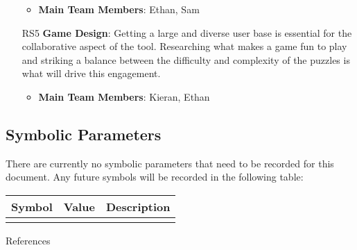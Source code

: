 \documentclass[12pt]{article}
\begin{document}
\begin{itemize}
    \begin{itemize}
        \item \textbf{Main Team Members}: Ethan, Sam
    \end{itemize}
    \item [RS5]\textbf{Game Design}: Getting a large and diverse user base is essential for the collaborative aspect of the tool. Researching what makes a game fun to play and striking a balance between the difficulty and complexity of the puzzles is what will drive this engagement. 
    \begin{itemize}
        \item \textbf{Main Team Members}: Kieran, Ethan
    \end{itemize}
\end{itemize}

\subsection{Symbolic Parameters}

There are currently no symbolic parameters that need to be recorded for this document. Any future symbols will be recorded in the following table: 

\begin{table}[h]
\begin{tabular}{|c|c|l|}
\hline
\textbf{Symbol} & \textbf{Value} & \textbf{Description} \\ \hline
                &                &                      \\ \hline
\end{tabular}
\end{table}

\newpage



 {References}
\end{document}
